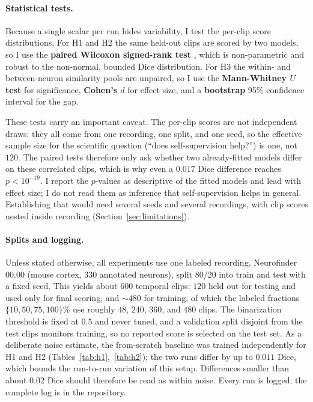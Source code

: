\documentclass[twoside,11pt]{article}
\begin{document}
\paragraph{Statistical tests.} Because a single scalar per run hides variability, I test the
per-clip score distributions. For H1 and H2 the same held-out clips are scored by two models, so I
use the \textbf{paired Wilcoxon signed-rank test} \citep{wilcoxon1945}, which is non-parametric and
robust to the non-normal, bounded Dice distribution. For H3 the within- and between-neuron similarity
pools are unpaired, so I use the \textbf{Mann-Whitney $U$ test} \citep{mannwhitney1947} for
significance, \textbf{Cohen's $d$} \citep{cohen1988} for effect size, and a \textbf{bootstrap}
\citep{efron1979} 95\% confidence interval for the gap.

These tests carry an important caveat. The per-clip scores are not independent draws: they all come
from one recording, one split, and one seed, so the effective sample size for the scientific question
(``does self-supervision help?'') is one, not $120$. The paired tests therefore only ask whether two
already-fitted models differ on these correlated clips, which is why even a $0.017$ Dice difference
reaches $p<10^{-19}$. I report the $p$-values as descriptive of the fitted models and lead with effect
size; I do not read them as inference that self-supervision helps in general. Establishing that would
need several seeds and several recordings, with clip scores nested inside recording
(Section~\ref{sec:limitations}).

\paragraph{Splits and logging.} Unless stated otherwise, all experiments use one labeled recording,
Neurofinder 00.00 (mouse cortex, $330$ annotated neurons), split 80/20 into train and test with a
fixed seed. This yields about $600$ temporal clips: $120$ held out for testing and used only for final
scoring, and $\sim 480$ for training, of which the labeled fractions $\{10, 50, 75, 100\}\%$ use
roughly $48$, $240$, $360$, and $480$ clips. The binarization threshold is fixed at $0.5$ and never
tuned, and a validation split disjoint from the test clips monitors training, so no reported score is
selected on the test set. As a deliberate noise estimate, the from-scratch baseline was trained
independently for H1 and H2 (Tables~\ref{tab:h1},~\ref{tab:h2}); the two runs differ by up to $0.011$
Dice, which bounds the run-to-run variation of this setup. Differences smaller than about $0.02$ Dice
should therefore be read as within noise. Every run is logged; the complete log is in the repository.
\end{document}
